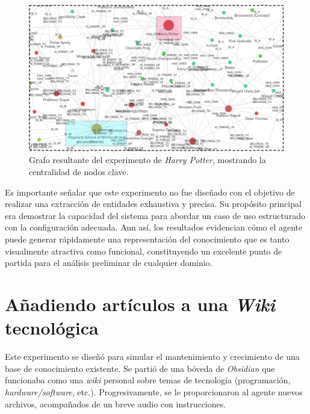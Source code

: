\begin{figure}[h]
    \centering
    \includegraphics[width=1.0\textwidth]{figures/HPKG.pdf}
    \caption{Grafo resultante del experimento de \textit{Harry Potter}, mostrando la centralidad de nodos clave.}
    \label{fig:hp_graph}
\end{figure}

Es importante señalar que este experimento no fue diseñado con el objetivo de realizar una extracción de entidades exhaustiva y precisa. Su propósito principal era demostrar la capacidad del sistema para abordar un caso de uso estructurado con la configuración adecuada. Aun así, los resultados evidencian cómo el agente puede generar rápidamente una representación del conocimiento que es tanto visualmente atractiva como funcional, constituyendo un excelente punto de partida para el análisis preliminar de cualquier dominio.

\section{Añadiendo artículos a una \textit{Wiki} tecnológica}
Este experimento se diseñó para simular el mantenimiento y crecimiento de una base de conocimiento existente. Se partió de una bóveda de \textit{Obsidian} que funcionaba como una \textit{wiki} personal sobre temas de tecnología (programación, \textit{hardware/software}, etc.). Progresivamente, se le proporcionaron al agente nuevos archivos, acompañados de un breve audio con instrucciones.

